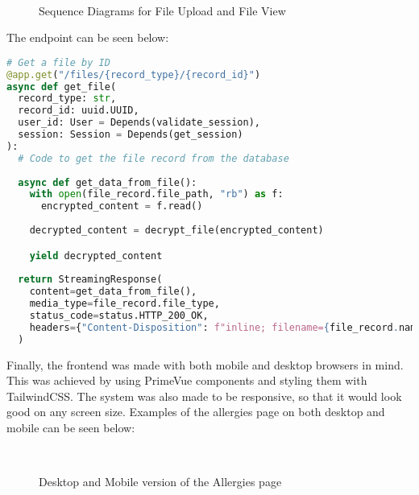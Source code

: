 \FloatBarrier{}

\begin{figure}[ht]
  \centering
  \\
  \caption{Sequence Diagrams for File Upload and File View}\label{fig:fileuploadview}
\end{figure}

\FloatBarrier{}

The endpoint can be seen below:

\begin{lstlisting}[language=Python, caption=File Download Endpoint]
# Get a file by ID
@app.get("/files/{record_type}/{record_id}")
async def get_file(
  record_type: str,
  record_id: uuid.UUID,
  user_id: User = Depends(validate_session),
  session: Session = Depends(get_session)    
):    
  # Code to get the file record from the database
  
  async def get_data_from_file():
    with open(file_record.file_path, "rb") as f:
      encrypted_content = f.read()
      
    decrypted_content = decrypt_file(encrypted_content)

    yield decrypted_content
    
  return StreamingResponse(
    content=get_data_from_file(),
    media_type=file_record.file_type,
    status_code=status.HTTP_200_OK,
    headers={"Content-Disposition": f"inline; filename={file_record.name}"}
  )
\end{lstlisting}

Finally, the frontend was made with both mobile and desktop browsers in mind. This was achieved by using PrimeVue components and styling them with TailwindCSS. The system was also made to be responsive, so that it would look good on any screen size. Examples of the allergies page on both desktop and mobile can be seen below:

\begin{figure}[ht]
  \centering
  \\[\baselineskip]
  \caption{Desktop and Mobile version of the Allergies page}\label{fig:allergiespage}
\end{figure}

